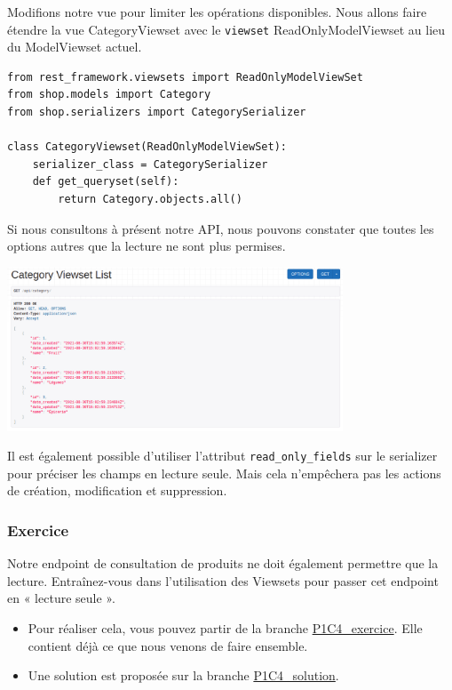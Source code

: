 Modifions notre vue pour limiter les opérations disponibles. Nous allons faire étendre la vue CategoryViewset  avec le {\tt viewset} {\color{monOrange}ReadOnlyModelViewset}   au lieu du {\color{monOrange}ModelViewset}  actuel.
\begin{verbatim}
from rest_framework.viewsets import ReadOnlyModelViewSet
from shop.models import Category
from shop.serializers import CategorySerializer
 
class CategoryViewset(ReadOnlyModelViewSet):
    serializer_class = CategorySerializer
    def get_queryset(self):
        return Category.objects.all()
\end{verbatim}
Si nous consultons à présent notre API, nous pouvons constater que toutes les options autres que la lecture ne sont plus permises.
\begin{center}
\includegraphics[width=10cm]{images/image08.png}
\end{center}
\begin{theorem}
Il est également possible d’utiliser l’attribut   {\tt read\_only\_fields}  sur le serializer pour préciser les champs en lecture seule. Mais cela n'empêchera pas les actions de création, modification et suppression.
\end{theorem}
\subsubsection*{Exercice}
Notre endpoint de consultation de produits ne doit également permettre que la lecture. Entraînez-vous dans l’utilisation des Viewsets  pour passer cet endpoint en « lecture seule ».
\begin{itemize}
\item Pour réaliser cela, vous pouvez partir de la branche \href{https://github.com/OpenClassrooms-Student-Center/7192416\_APIs\_DRF/tree/P1C4\_exercice}{P1C4\_exercice}. Elle contient déjà ce que nous venons de faire ensemble.
\item Une solution est proposée sur la branche \href{https://github.com/OpenClassrooms-Student-Center/7192416\_APIs\_DRF/tree/P1C4_solution}{P1C4\_solution}.
\end{itemize}
